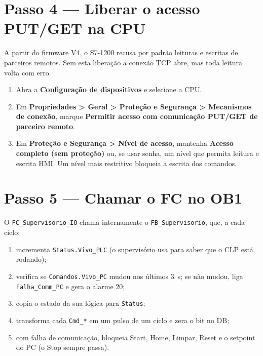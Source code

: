 \documentclass[12pt, oneside, a4paper, chapter=TITLE, section=TITLE, english, brazil]{abntex2}
\begin{document}
\chapter{Passo 4 --- Liberar o acesso PUT/GET na CPU}

A partir do firmware V4, o S7-1200 recusa por padrão leituras e escritas de parceiros remotos. Sem esta liberação a conexão TCP abre, mas toda leitura volta com erro.

\begin{enumerate}[label=\arabic*.]
  \item Abra a \textbf{Configuração de dispositivos} e selecione a CPU.
  \item Em \textbf{Propriedades > Geral > Proteção e Segurança > Mecanismos de conexão}, marque \textbf{Permitir acesso com comunicação PUT/GET de parceiro remoto}.
  \item Em \textbf{Proteção e Segurança > Nível de acesso}, mantenha \textbf{Acesso completo (sem proteção)} ou, se usar senha, um nível que permita leitura e escrita HMI. Um nível mais restritivo bloqueia a escrita dos comandos.
\end{enumerate}

\chapter{Passo 5 --- Chamar o FC no OB1}

O \texttt{FC\_Supervisorio\_IO} chama internamente o \texttt{FB\_Supervisorio}, que, a cada ciclo:

\begin{enumerate}[label=\alph*)]
  \item incrementa \texttt{Status.Vivo\_PLC} (o supervisório usa para saber que o CLP está rodando);
  \item verifica se \texttt{Comandos.Vivo\_PC} mudou nos últimos 3~s; se não mudou, liga \texttt{Falha\_Comm\_PC} e gera o alarme 20;
  \item copia o estado da sua lógica para \texttt{Status};
  \item transforma cada \texttt{Cmd\_*} em um pulso de um ciclo e zera o bit no DB;
  \item com falha de comunicação, bloqueia Start, Home, Limpar, Reset e o setpoint do PC (o Stop sempre passa).
\end{enumerate}
\end{document}
